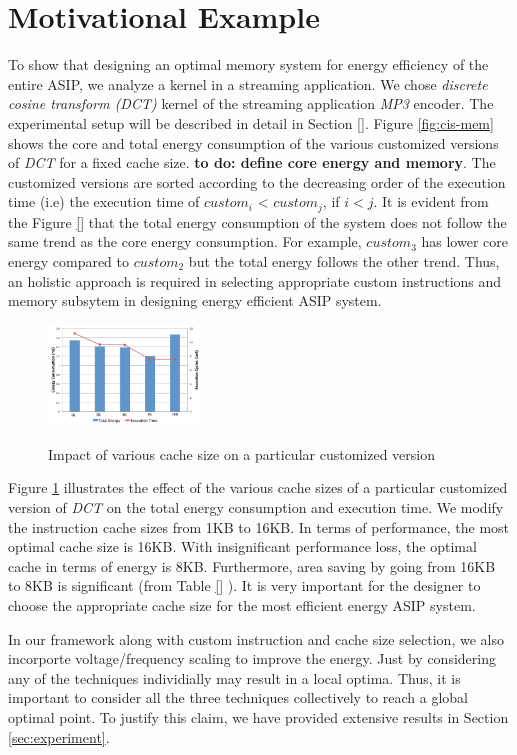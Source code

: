 \section{Motivational Example}
\label{sec:motivation}

To show that designing an optimal memory system for energy efficiency of the entire ASIP, we analyze a kernel in a streaming application. We chose \textit{discrete cosine transform (DCT)} kernel of the streaming application \textit{MP3} encoder. The experimental setup will be described in detail in Section \ref{}. Figure \ref{fig:cis-mem} shows the core and total energy consumption of the various customized versions of \textit{DCT} for a fixed cache size. {\bf to do: define core energy and memory}. The customized versions are sorted according to the decreasing order of the execution time (i.e) the execution time of $custom_i$ < $custom_j$, if \begin{math}i<j\end{math}. It is evident from the Figure \ref{} that the total energy consumption of the system does not follow the same trend as the core energy consumption. For example, $custom_3$ has lower core energy compared to $custom_2$ but the total energy follows the other trend. Thus, an holistic approach is required in selecting appropriate custom instructions and memory subsytem in designing energy efficient ASIP system. 
\begin{figure}[h]
\center
\includegraphics[width=0.36\textwidth]{cache-size.pdf}
\label{fig:cache-size}
\caption {Impact of various cache size on a particular customized version}
\end{figure}

Figure \ref{fig:cache-size} illustrates the effect of the various cache sizes of a particular customized version of \textit{DCT} on the total energy consumption and execution time. We modify the instruction cache sizes from 1KB to 16KB. In terms of performance, the most optimal cache size is 16KB. With insignificant performance loss, the optimal cache in terms of energy is 8KB. Furthermore, area saving by going from 16KB to 8KB is significant (from Table \ref{} ). It is very important for the designer to choose the appropriate cache size for the most efficient energy ASIP system. 

In our framework along with custom instruction and cache size selection, we also incorporte voltage/frequency scaling to improve the energy. Just by considering any of the techniques individially may result in a local optima. Thus, it is important to consider all the three techniques collectively to reach a global optimal point. To justify this claim, we have provided extensive results in Section \ref{sec:experiment}.  
